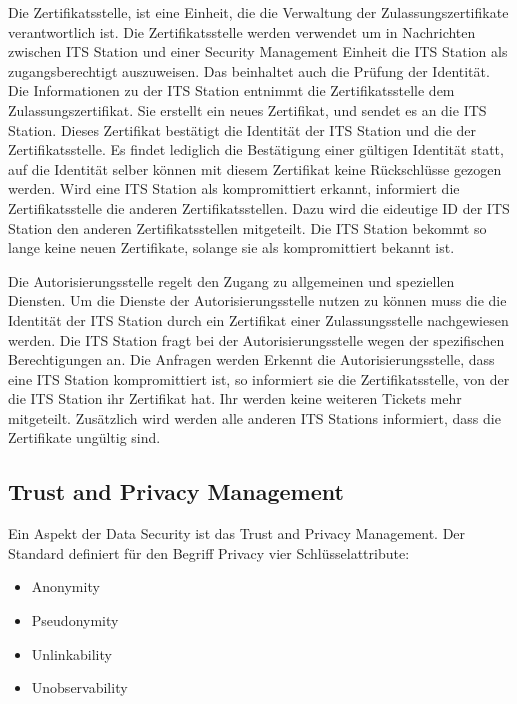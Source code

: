 Die Zertifikatsstelle, ist eine Einheit, die die Verwaltung der Zulassungszertifikate verantwortlich ist. Die Zertifikatsstelle werden verwendet um in Nachrichten zwischen \ac{ITS} Station und einer Security Management Einheit die \ac{ITS} Station als zugangsberechtigt auszuweisen. Das beinhaltet auch die Prüfung der Identität. Die Informationen zu der \ac{ITS} Station entnimmt die Zertifikatsstelle dem Zulassungszertifikat. Sie erstellt ein neues Zertifikat, und sendet es an die \ac{ITS} Station. Dieses Zertifikat bestätigt die Identität der \ac{ITS} Station und die der Zertifikatsstelle. Es findet lediglich die Bestätigung einer gültigen Identität statt,  auf die Identität selber können mit diesem Zertifikat keine Rückschlüsse gezogen werden. Wird eine \ac{ITS} Station als kompromittiert erkannt, informiert die Zertifikatsstelle die anderen Zertifikatsstellen. Dazu wird die eideutige \ac{ID} der \ac{ITS} Station den anderen Zertifikatsstellen mitgeteilt. Die \ac{ITS} Station bekommt so lange keine neuen Zertifikate, solange sie als kompromittiert bekannt ist.  

Die Autorisierungsstelle regelt den Zugang zu allgemeinen und speziellen Diensten. Um die Dienste der Autorisierungsstelle nutzen zu können muss die die Identität der \ac{ITS} Station durch ein Zertifikat einer Zulassungsstelle nachgewiesen werden. Die \ac{ITS} Station fragt bei der Autorisierungsstelle wegen der spezifischen Berechtigungen an. Die Anfragen werden  Erkennt die Autorisierungsstelle, dass eine \ac{ITS} Station kompromittiert ist, so informiert sie die Zertifikatsstelle, von der die \ac{ITS} Station ihr Zertifikat hat. Ihr werden keine weiteren Tickets mehr mitgeteilt. Zusätzlich wird werden alle anderen \ac{ITS} Stations informiert, dass die Zertifikate ungültig sind.  


\subsection{Trust and Privacy Management}

Ein Aspekt der Data Security ist das Trust and Privacy Management. Der Standard \cite{ts102941} definiert für  den Begriff Privacy vier Schlüsselattribute:
\begin{itemize}
	\item Anonymity
	\item Pseudonymity
	\item Unlinkability
	\item Unobservability
\end{itemize}

